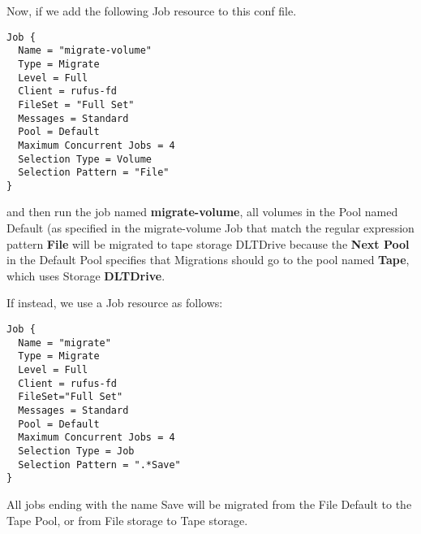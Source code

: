 Now, if we add the following Job resource to this conf file.

\footnotesize
\begin{verbatim}
Job {
  Name = "migrate-volume"
  Type = Migrate
  Level = Full
  Client = rufus-fd 
  FileSet = "Full Set"
  Messages = Standard
  Pool = Default
  Maximum Concurrent Jobs = 4
  Selection Type = Volume
  Selection Pattern = "File"
}
\end{verbatim}
\normalsize

and then run the job named {\bf migrate-volume}, all volumes in the Pool
named Default (as specified in the migrate-volume Job that match the 
regular expression pattern {\bf File} will be migrated to tape storage 
DLTDrive because the {\bf Next Pool} in the Default Pool specifies that
Migrations should go to the pool named {\bf Tape}, which uses
Storage {\bf DLTDrive}.

If instead, we use a Job resource as follows:

\footnotesize
\begin{verbatim}
Job {
  Name = "migrate"
  Type = Migrate
  Level = Full
  Client = rufus-fd
  FileSet="Full Set"
  Messages = Standard
  Pool = Default
  Maximum Concurrent Jobs = 4
  Selection Type = Job 
  Selection Pattern = ".*Save"
}
\end{verbatim}
\normalsize

All jobs ending with the name Save will be migrated from the File Default to
the Tape Pool, or from File storage to Tape storage.
